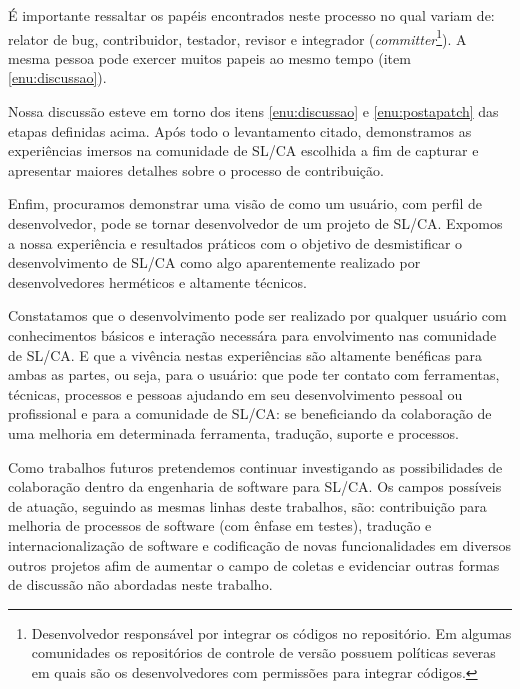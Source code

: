 É importante ressaltar os papéis encontrados neste processo no qual variam de: relator de bug, contribuidor, testador, revisor e integrador (\textit{committer}\footnote{Desenvolvedor responsável por integrar os códigos no repositório. Em algumas comunidades os repositórios de controle de versão possuem políticas severas em quais são os desenvolvedores com permissões para integrar códigos.}). A mesma pessoa pode exercer muitos papeis ao mesmo tempo (item \ref{enu:discussao}).

Nossa discussão esteve em torno dos itens \ref{enu:discussao} e \ref{enu:postapatch} das etapas definidas acima. Após todo o levantamento citado, demonstramos as experiências imersos na comunidade de SL/CA escolhida a fim de capturar e apresentar maiores detalhes sobre o processo de contribuição.

Enfim, procuramos demonstrar uma visão de como um usuário, com perfil de desenvolvedor, pode se tornar desenvolvedor de um projeto de SL/CA. Expomos a nossa experiência e resultados práticos com o objetivo de desmistificar o desenvolvimento de SL/CA como algo aparentemente realizado por desenvolvedores herméticos e altamente técnicos.

Constatamos que o desenvolvimento pode ser realizado por qualquer usuário com conhecimentos básicos e interação necessára para envolvimento nas comunidade de SL/CA. E que a vivência nestas experiências são altamente benéficas para ambas as partes, ou seja, para o usuário: que pode ter contato com ferramentas, técnicas, processos e pessoas ajudando em seu desenvolvimento pessoal ou profissional e para a comunidade de SL/CA: se beneficiando da colaboração de uma melhoria em determinada ferramenta, tradução, suporte e processos.

Como trabalhos futuros pretendemos continuar investigando as possibilidades de colaboração dentro da engenharia de software para SL/CA. Os campos possíveis de atuação, seguindo as mesmas linhas deste trabalhos, são: contribuição para melhoria de processos de software (com ênfase em testes), tradução e internacionalização de software e codificação de novas funcionalidades em diversos outros projetos afim de aumentar o campo de coletas e evidenciar outras formas de discussão não abordadas neste trabalho.

